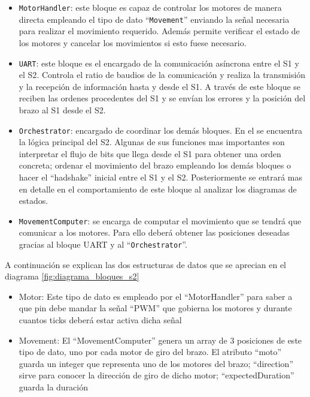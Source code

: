 \begin{itemize}
    \item \texttt{MotorHandler}: este bloque es capaz de controlar los motores de manera directa empleando el tipo de dato ``\texttt{Movement}'' enviando la señal necesaria para realizar el movimiento requerido. Además permite verificar el estado de los motores y cancelar los movimientos si esto fuese necesario.
    
    \item \texttt{UART}: este bloque es el encargado de la comunicación asíncrona entre el \ac{S1} y el \ac{S2}. Controla el ratio de baudios de la comunicación y realiza la transmisión y la recepción de información hasta y desde el \ac{S1}. A través de este bloque se reciben las ordenes procedentes del \ac{S1} y se envían los errores y la posición del brazo al S1 desde el \ac{S2}.
    
    \item \texttt{Orchestrator}: encargado de coordinar los demás bloques. En el se encuentra la lógica principal del \ac{S2}. Algunas de sus funciones mas importantes son interpretar el flujo de bits que llega desde el S1 para obtener una orden concreta; ordenar el movimiento del brazo empleando los demás bloques o hacer el ``hadshake'' inicial entre el \ac{S1} y el \ac{S2}. Posteriormente se entrará mas en detalle en el comportamiento de este bloque al analizar los diagramas de estados.
    
    \item \texttt{MovementComputer}: se encarga de computar el movimiento que se tendrá que comunicar a los motores. Para ello deberá obtener las posiciones deseadas gracias al bloque UART y al ``\texttt{Orchestrator}''.
\end{itemize}

A continuación se explican las dos estructuras de datos que se aprecian en el diagrama \ref{fig:diagrama_bloques_s2}

\begin{itemize}
    \item Motor: Este tipo de dato es empleado por el ``MotorHandler'' para saber a que pin debe mandar la señal ``PWM'' que gobierna los motores y durante cuantos ticks deberá estar activa dicha señal
    
    \item Movement: El ``MovementComputer'' genera un array de 3 posiciones de este tipo de dato, uno por cada motor de giro del brazo. El atributo ``moto'' guarda un integer que representa uno de los motores del brazo; ``direction'' sirve para conocer la dirección de giro de dicho motor; ``expectedDuration'' guarda la duración  
\end{itemize}

